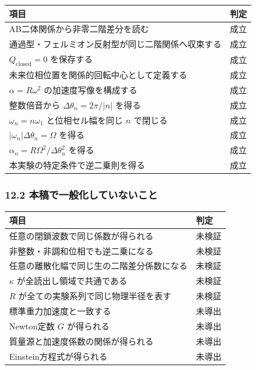 \documentclass[
  10pt,
  a4paper,
]{ltjsarticle}
\newcounter{none} %
\begin{document}
{\def\LTcaptype{none} %
\begin{longtable}[]{@{}ll@{}}
\toprule\noalign{}
項目 & 判定 \\
\midrule\noalign{}
\endhead
\bottomrule\noalign{}
\endlastfoot
AB二体関係から非零二階差分を読む & 成立 \\
通過型・フェルミオン反射型が同じ二階関係へ収束する & 成立 \\
\(Q_{\mathrm{closed}}=0\) を保存する & 成立 \\
未来位相位置を関係的回転中心として定義する & 成立 \\
\(\alpha=R\omega^2\) の加速度写像を構成する & 成立 \\
整数倍音から \(\Delta\theta_n=2\pi/\lvert n\rvert\) を得る & 成立 \\
\(\omega_n=n\omega_1\) と位相セル幅を同じ \(n\) で閉じる & 成立 \\
\(\lvert\omega_n\rvert\Delta\theta_n=\Omega\) を得る & 成立 \\
\(\alpha_n=R\Omega^2/\Delta\theta_n^2\) を得る & 成立 \\
本実験の特定条件で逆二乗則を得る & 成立 \\
\end{longtable}
}

\subsubsection{12.2
本稿で一般化していないこと}\label{ux672cux7a3fux3067ux4e00ux822cux5316ux3057ux3066ux3044ux306aux3044ux3053ux3068}

{\def\LTcaptype{none} %
\begin{longtable}[]{@{}ll@{}}
\toprule\noalign{}
項目 & 判定 \\
\midrule\noalign{}
\endhead
\bottomrule\noalign{}
\endlastfoot
任意の閉鎖波数で同じ係数が得られる & 未検証 \\
非整数・非調和位相でも逆二乗になる & 未検証 \\
任意の離散化幅で同じ生の二階差分係数になる & 未検証 \\
\(\kappa\) が全読出し領域で共通である & 未検証 \\
\(R\) が全ての実験系列で同じ物理半径を表す & 未検証 \\
標準重力加速度と一致する & 未導出 \\
Newton定数 \(G\) が得られる & 未導出 \\
質量源と加速度係数の関係が得られる & 未導出 \\
Einstein方程式が得られる & 未導出 \\
\end{longtable}
}
\end{document}
